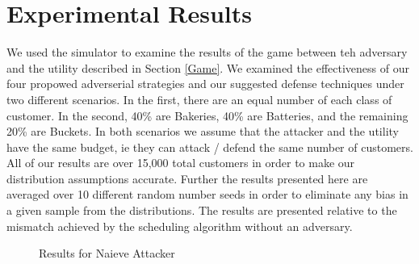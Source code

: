 \section{Experimental Results}
\label{Experimental Results}

We used the simulator to examine the results of the game between teh adversary and the utility described in Section \ref{Game}.  We examined the effectiveness of our four propowed adverserial strategies and our suggested defense techniques under two different scenarios.  In the first, there are an equal number of each class of customer.  In the second, 40\% are Bakeries, 40\% are Batteries, and the remaining 20\% are Buckets.  In both scenarios we assume that the attacker and the utility have the same budget, ie they can attack / defend the same number of customers.  All of our results are over 15,000 total customers in order to make our distribution assumptions accurate.  Further the results presented here are averaged over 10 different random number seeds in order to eliminate any bias in a given sample from the distributions.  The results are presented relative to the mismatch achieved by the scheduling algorithm without an adversary.    

\begin{figure}[htp]
    \centering
    \quad
    \caption{Results for Naieve Attacker}
    \label{naieve}  
\end{figure}

